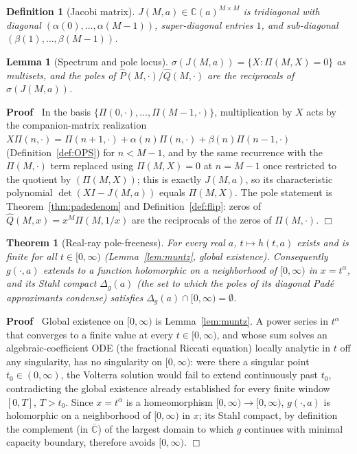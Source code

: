 \documentclass{article}
\newenvironment{proof}{\noindent\textbf{Proof\ }}{\hspace*{\fill}$\Box$\medskip}
\newtheorem{definition}{Definition}
\newtheorem{lemma}{Lemma}
{\theorembodyfont{\rmfamily\small}\newtheorem{problem}{Problem}}
\newtheorem{theorem}{Theorem}
\newcommand{\C}{\mathbb{C}}
\begin{document}
\begin{definition}
  [Jacobi matrix]\label{def:Jacobi} $J (M, a) \in \C (a)^{M \times M}$ is
  tridiagonal with diagonal $(\alpha (0), \ldots, \alpha (M - 1))$,
  super-diagonal entries $1$, and sub-diagonal $(\beta (1), \ldots, \beta (M
  - 1))$.
\end{definition}

\begin{lemma}
  [Spectrum and pole locus]\label{lem:spectrum} $\sigma (J (M, a)) = \{ X :
  \Pi (M, X) = 0 \}$ as multisets, and the poles of $\hat{P} (M, \cdot) /
  \hat{Q} (M, \cdot)$ are the reciprocals of $\sigma (J (M, a))$.
\end{lemma}

\begin{proof}
  In the basis $\{ \Pi (0, \cdot), \ldots, \Pi (M - 1, \cdot) \}$,
  multiplication by $X$ acts by the companion-matrix realization $X \Pi (n,
  \cdot) = \Pi (n + 1, \cdot) + \alpha (n) \Pi (n, \cdot) + \beta (n) \Pi (n -
  1, \cdot)$ (Definition~\ref{def:OPS}) for $n < M - 1$, and by the same
  recurrence with the $\Pi (M, \cdot)$ term replaced using $\Pi (M, X) = 0$
  at $n = M - 1$ once restricted to the quotient by $(\Pi (M, X))$; this is
  exactly $J (M, a)$, so its characteristic polynomial $\det (XI - J (M, a))$
  equals $\Pi (M, X)$. The pole statement is Theorem~\ref{thm:padedenom} and
  Definition~\ref{def:flip}: zeros of $\hat{Q} (M, x) = x^M \Pi (M, 1 / x)$
  are the reciprocals of the zeros of $\Pi (M, \cdot)$.
\end{proof}

\begin{theorem}
  [Real-ray pole-freeness]\label{thm:realray} For every real $a$, $t \mapsto
  h (t, a)$ exists and is finite for all $t \in [0, \infty)$
  (Lemma~\ref{lem:muntz}, global existence). Consequently $g (\cdot, a)$
  extends to a function holomorphic on a neighborhood of $[0, \infty)$ in $x
  = t^{\alpha}$, and its Stahl compact $\Delta_g (a)$ (the set to which the
  poles of its diagonal Pad{\'e} approximants condense) satisfies $\Delta_g
  (a) \cap [0, \infty) = \emptyset$.
\end{theorem}

\begin{proof}
  Global existence on $[0, \infty)$ is Lemma~\ref{lem:muntz}. A power series
  in $t^{\alpha}$ that converges to a finite value at every $t \in [0,
  \infty)$, and whose sum solves an algebraic-coefficient ODE (the fractional
  Riccati equation) locally analytic in $t$ off any singularity, has no
  singularity on $[0, \infty)$: were there a singular point $t_0 \in (0,
  \infty)$, the Volterra solution would fail to extend continuously past
  $t_0$, contradicting the global existence already established for every
  finite window $[0, T]$, $T > t_0$. Since $x = t^{\alpha}$ is a
  homeomorphism $[0, \infty) \to [0, \infty)$, $g (\cdot, a)$ is holomorphic
  on a neighborhood of $[0, \infty)$ in $x$; its Stahl compact, by
  definition the complement (in $\overline{\C}$) of the largest domain to
  which $g$ continues with minimal capacity boundary, therefore avoids $[0,
  \infty)$.
\end{proof}
\end{document}
